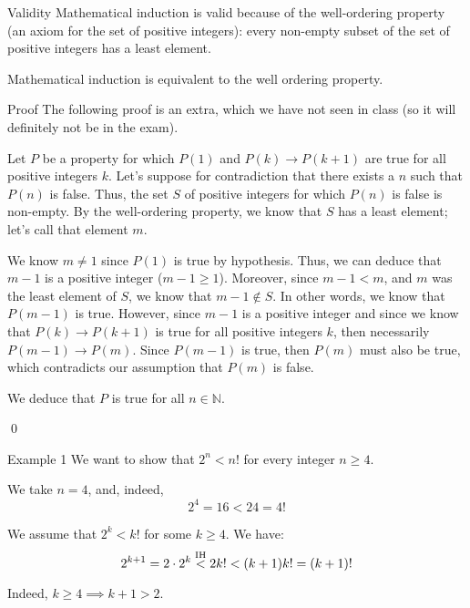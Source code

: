 \documentclass[a4paper]{article}
\begin{document}
\begin{parag}{Validity}
    Mathematical induction is valid because of the well-ordering property (an axiom for the set of positive integers): every non-empty subset of the set of positive integers has a least element.

    Mathematical induction is equivalent to the well ordering property.

    \begin{subparag}{Proof}
        The following proof is an extra, which we have not seen in class (so it will definitely not be in the exam).

        Let $P$ be a property for which $P\left(1\right)$ and $P\left(k\right) \to P\left(k+1\right)$ are true for all positive integers $k$. Let's suppose for contradiction that there exists a $n$ such that $P\left(n\right)$ is false. Thus, the set $S$ of positive integers for which $P\left(n\right)$ is false is non-empty. By the well-ordering property, we know that $S$ has a least element; let's call that element $m$.

        We know $m \neq 1$ since $P\left(1\right)$ is true by hypothesis. Thus, we can deduce that $m - 1$ is a positive integer ($m - 1 \geq 1$). Moreover, since $m - 1 < m$, and $m$ was the least element of $S$, we know that $m - 1 \not \in S$. In other words, we know that $P\left(m-1\right)$ is true. However, since $m-1$ is a positive integer and since we know that $P\left(k\right) \to P\left(k+1\right)$ is true for all positive integers $k$, then necessarily $P\left(m-1\right) \to P\left(m\right)$. Since $P\left(m-1\right)$ is true, then $P\left(m\right)$ must also be true, which contradicts our assumption that $P\left(m\right)$ is false.

        We deduce that $P$ is true for all $n \in \mathbb{N}$.

        \qed
    \end{subparag}
\end{parag}

\begin{parag}{Example 1}
    We want to show that $2^n < n!$ for every integer $n \geq 4$.

     We take $n = 4$, and, indeed,
    \[2^4 = 16 < 24 = 4!\]

     We assume that $2^k < k!$ for some $k \geq 4$. We have:
    \[2^{k+1} = 2\cdot 2^{k} \over{<}{IH}  2 k! < \left(k+1\right)k! = \left(k+1\right)! \]

    Indeed, $k \geq 4 \implies k + 1 > 2$.
\end{parag}
\end{document}
